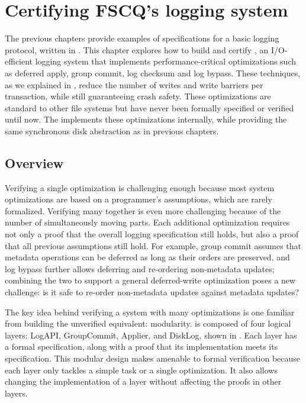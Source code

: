 \section{Certifying FSCQ's logging system}
\label{sec:log}

\newcommand{\logapi}{LogAPI\xspace}
\newcommand{\grouplog}{GroupCommit\xspace}
\newcommand{\memlog}{Applier\xspace}
\newcommand{\disklog}{DiskLog\xspace}

The previous chapters provide examples of specifications for a basic
logging protocol, written in \chl.  This chapter explores how to build and
certify \syslog, an I/O-efficient logging system that implements
performance-critical optimizations such as deferred apply, group commit,
log checksum and log bypass.  These techniques, as we explained in
, reduce the number of writes and write barriers per
transaction, while still guaranteeing crash safety.  These optimizations
are standard to other file systems but have never been formally
specified or verified until now.  The \syslog implements these
optimizations internally, while providing the same synchronous disk
abstraction as in previous chapters.

\subsection{Overview}

Verifying a single optimization is challenging enough because most system
optimizations are based on a programmer's assumptions, which are rarely
formalized. Verifying many together is even more challenging because of the
number of simultaneously moving parts. Each additional optimization
requires not only a proof that the overall logging specification still
holds, but also a proof that all previous assumptions still hold.
For example, group commit assumes that metadata operations can be deferred
as long as their orders are preserved, and log bypass further allows
deferring and re-ordering non-metadata updates; combining the two to
support a general deferred-write optimization poses a new challenge: is it
safe to re-order non-metadata updates against metadata updates?

The key idea behind verifying a system with many optimizations is one
familiar from building the unverified equivalent: modularity.  \syslog is
composed of four logical layers: \logapi, \grouplog, \memlog, and \disklog,
shown in .  Each layer has a formal specification, along with
a proof that its implementation meets its specification.  This modular
design makes \syslog amenable to formal verification because each layer
only tackles a simple task or a single optimization.  It also allows
changing the implementation of a layer without affecting the proofs in
other layers.

